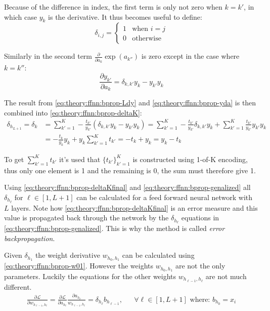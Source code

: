 Because of the difference in index, the first term is only not zero when $k = k'$, in which case $y_k$ is the derivative. It thus becomes useful to define:
\begin{equation}
\delta_{i,j} = \begin{cases}1& \text{when } i = j \\ 0 & \text{otherwise}\end{cases}
\end{equation}

Similarly in the second term $\frac{\partial}{\partial a_k} \exp(a_{k''})$ is zero except in the case where $k = k''$:
\begin{equation}
\frac{\partial y_{k'}}{\partial a_k} = \delta_{k, k'} y_k - y_{k'} y_k
\label{eq:theory:ffnn:bprop-yda}
\end{equation}

The result from \eqref{eq:theory:ffnn:bprop-Ldy} and \eqref{eq:theory:ffnn:bprop-yda} is then combined into \eqref{eq:theory:ffnn:bprop-deltaK}:
\begin{equation}
\begin{aligned}
\delta_{h_{L + 1}} = \delta_k &= \sum_{k'=1}^K -\frac{t_{k'}}{y_{k'}} \left( \delta_{k, k'} y_k - y_{k'} y_k \right) = \sum_{k'=1}^K -\frac{t_{k'}}{y_{k'}} \delta_{k, k'} y_k + \sum_{k'=1}^K \frac{t_{k'}}{y_{k'}} y_{k'} y_k \\
&= -\frac{t_k}{y_k} y_k + y_k \sum_{k'=1}^K t_{k'} = -t_k + y_k = y_k - t_k
\end{aligned}
\label{eq:theory:ffnn:bprop-deltaKfinal}
\end{equation}

To get $\sum_{k'=1}^K t_{k'}$ it's used that $\{ t_{k'} \}_{k'=1}^K$ is constructed using 1-of-K encoding, thus only one element is 1 and the remaining is 0, the sum must therefore give 1.

Using \eqref{eq:theory:ffnn:bprop-deltaKfinal} and \eqref{eq:theory:ffnn:bprop-genalized} all $\delta_{h_\ell}$ for $\ell \in [1, L+1]$ can be calculated for a feed forward neural network with $L$ layers. Note how \eqref{eq:theory:ffnn:bprop-deltaKfinal} is an error measure and this value is propagated back through the network by the $\delta_{h_\ell}$ equations in \eqref{eq:theory:ffnn:bprop-genalized}. This is why the method is called \textit{error backpropagation}.

Given $\delta_{h_1}$ the weight derivative $w_{h_0, h_1}$ can be calculated using \eqref{eq:theory:ffnn:bprop-w01}. However the weights $w_{h_0, h_1}$ are not the only parameters. Luckily the equations for the other weights $w_{h_{\ell-1}, h_\ell}$ are not much different.
\begin{equation}
\begin{aligned}
\frac{\partial \mathcal{L}}{\partial w_{h_{\ell-1}, h_\ell}} = \frac{\partial \mathcal{L}}{\partial a_{h_\ell}}
\frac{\partial a_{h_\ell}}{w_{h_{\ell-1}, h_\ell}} = \delta_{h_\ell} b_{h_{\ell-1}}, && \forall \ell \in [1, L+1] \text{ where: } b_{h_0} = x_i
\end{aligned}
\end{equation}
